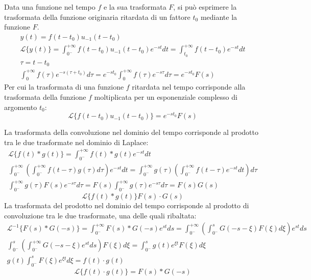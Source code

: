 \documentclass{article}
\numberwithin{equation}{subsection}
\begin{document}
Data una funzione nel tempo $f$ e la sua trasformata $F$, si può esprimere la trasformata della funzione originaria ritardata di un fattore $t_0$ mediante 
la funzione $F$. 
\begin{gather*}
    y(t)=f(t-t_0)u_{-1}(t-t_0)\\
    \mathcal{L}\{y(t)\}=\displaystyle\int_{0^-}^{+\infty}f(t-t_0)u_{-1}(t-t_0)e^{-st}dt=\int_{t_0}^{+\infty}f(t-t_0)e^{-st}dt\\
    \tau=t-t_0\\
    \displaystyle\int_{0}^{+\infty}f(\tau)e^{-s(\tau+t_0)}d\tau=e^{-st_0}\int_0^{+\infty}f(\tau)e^{-s\tau}d\tau=e^{-st_0}F(s)
\end{gather*}
Per cui la trasformata di una funzione $f$ ritardata nel tempo corrisponde alla trasformata della funzione $f$ moltiplicata per un esponenziale complesso di argomento $t_0$:
\begin{equation}
    \mathcal{L}\{f(t-t_0)u_{-1}(t-t_0)\}=e^{-st_0}F(s)
\end{equation}


La trasformata della convoluzione nel dominio del tempo corrisponde al prodotto tra le due trasformate nel dominio di Laplace:
\begin{gather*}
    \mathcal{L}\{f(t)* g(t)\}=\displaystyle\int_{0^-}^{+\infty}f(t)*g(t)e^{-st}dt\\
    \displaystyle\int_{0^-}^{+\infty}\left(\int_{0^-}^{+\infty}f(t-\tau)g(\tau)d\tau\right)e^{-st}dt=\int_{0^-}^{+\infty}g(\tau)\left(\int_{0^-}^{+\infty}f(t-\tau)e^{-st}dt\right)d\tau\\
    \displaystyle\int_{0^-}^{+\infty}g(\tau)F(s)e^{-s\tau}d\tau=F(s)\int_{0^-}^{+\infty}g(\tau)e^{-s\tau}d\tau=F(s)G(s)
\end{gather*}
\begin{equation}
    \mathcal{L}\{f(t)*g(t)\}F(s)\cdot G(s)
\end{equation}
La trasformata del prodotto nel dominio del tempo corrisponde al prodotto di convoluzione tra le due trasformate, una delle quali ribaltata:
\begin{gather*}
    \mathcal{L}^{-1}\{F(s)*G(-s)\}=\displaystyle\int_{0^-}^{+\infty}F(s)*G(-s)e^{st}ds=\int_{0^-}^{+\infty}\left(\int_{0^-}^sG(-s-\xi)F(\xi)d\xi\right)e^{st}ds\\
    \displaystyle\int_{0^-}^{s}\left(\int_{0^-}^{+\infty}G(-s-\xi)e^{st}ds\right)F(\xi)d\xi=\int_{0^-}^sg(t)e^{\xi t}F(\xi)d\xi\\
    g(t)\displaystyle\int_{0^-}^{s}F(\xi)e^{\xi t}d\xi=f(t)\cdot g(t)
\end{gather*}
\begin{equation}
    \mathcal{L}\{f(t)\cdot g(t)\}=F(s)*G(-s)
\end{equation}
\end{document}
